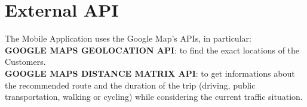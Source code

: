 \section{External API}
 
 The Mobile Application uses the Google Map’s APIs, in particular: \\
 \textbf{GOOGLE MAPS GEOLOCATION API}: to find the exact locations of the Customers.\\
 \textbf{GOOGLE MAPS DISTANCE MATRIX API}: to get informations about the recommended route and the duration of the trip (driving, public transportation, walking or cycling) while considering the current traffic situation. 